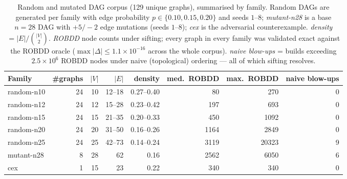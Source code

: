 \begin{table}[t]
\centering
\caption{Random and mutated DAG corpus (129 unique graphs), summarised by family. Random DAGs are
generated per family with edge probability $p\in\{0.10,0.15,0.20\}$ and seeds $1$--$8$; \emph{mutant-n28}
is a base $n{=}28$ DAG with $+5/-2$ edge mutations (seeds $1$--$8$); \emph{cex} is the adversarial
counterexample. \emph{density} $=|E|/\binom{|V|}{2}$. \emph{ROBDD} node counts under sifting; every graph
in every family was validated exact against the ROBDD oracle ($\max|\Delta|\le1.1\times10^{-16}$ across the
whole corpus). \emph{naive blow-ups} = builds exceeding $2.5\times10^{6}$ ROBDD nodes under naive
(topological) ordering --- all of which sifting resolves.}
\label{tab:corpus}
\begin{tabular}{lrrrrrrr}
\hline
Family & \#graphs & $|V|$ & $|E|$ & density & med.\ ROBDD & max.\ ROBDD & naive blow-ups \\
\hline
random-n10  & 24 & 10 & 12--18 & 0.27--0.40 &   80 &   270 & 0 \\
random-n12  & 24 & 12 & 15--28 & 0.23--0.42 &  197 &   693 & 0 \\
random-n15  & 24 & 15 & 21--35 & 0.20--0.33 &  450 &  1092 & 0 \\
random-n20  & 24 & 20 & 31--50 & 0.16--0.26 & 1164 &  2849 & 0 \\
random-n25  & 24 & 25 & 42--73 & 0.14--0.24 & 3119 & 20323 & 9 \\
mutant-n28  &  8 & 28 & 62     & 0.16       & 2562 &  6050 & 6 \\
cex         &  1 & 15 & 23     & 0.22       &  340 &   340 & 0 \\
\hline
\end{tabular}
\end{table}
